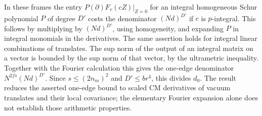 In these frames the entry $P(\partial)F_v(cZ)|_{Z=0}$ for an integral homogeneous Schur polynomial $P$ of degree $D'$ costs the denominator $(Nd)^{D'}$ if $c$ is $p$-integral. This follows by multiplying by $(Nd)^{D'}$, using homogeneity, and expanding $P$ in integral monomials in the derivatives. The same assertion holds for integral linear combinations of translates. The sup norm of the output of an integral matrix on a vector is bounded by the sup norm of that vector, by the ultrametric inequality. Together with the Fourier calculation this gives the one-edge denominator $N^{2fs}(Nd)^{D'}$. Since $s\le(2n_m)^2$ and $D'\le br^4$, this divides $d_0$. The result reduces the asserted one-edge bound to scaled CM derivatives of vacuum translates and their local covariance; the elementary Fourier expansion alone does not establish those arithmetic properties.
